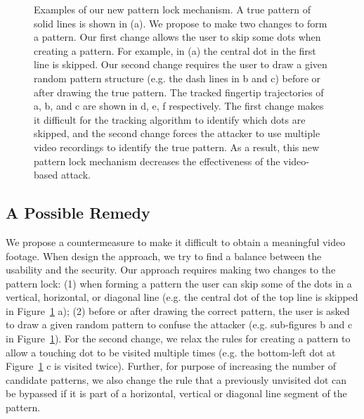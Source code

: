 \begin{figure}[!t]
{        }
        \caption{Examples of our new pattern lock mechanism. A true pattern of solid lines is shown
        in (a). We propose to make two changes to form a pattern.
        Our first change allows the user to skip some dots when creating a pattern.
        For example, in (a) the central dot in the first line is skipped.
        Our second change requires the user to draw a given random pattern structure (e.g. the dash lines in b and c)  before or after drawing the true pattern.
        The tracked fingertip trajectories of a, b, and c are shown in d, e, f respectively.
        The first change makes it difficult for the tracking algorithm to identify which dots are skipped, and the second change
         forces the attacker to use multiple video recordings to identify the true pattern. As a result, this new pattern lock mechanism decreases the
        effectiveness of the video-based attack.
        }
        \label{fig:protection}
    \end{figure}

\subsection{A Possible Remedy}
\label{section: potential-remedy}
We propose a countermeasure to make it difficult to obtain a meaningful video footage. When design the approach, we try
to find a balance between the usability and the security. Our approach requires making two  changes to the pattern
lock: (1) when forming a pattern the user can skip some of the dots in a vertical, horizontal, or diagonal line
(e.g. the central dot of the top line is skipped in Figure~\ref{fig:protection} a); (2) before or after drawing the correct pattern, the user is asked to draw a given random
pattern to confuse the attacker (e.g. sub-figures b and c in Figure~\ref{fig:protection}). For the second change, we relax the rules for
creating a pattern to allow a touching dot to be visited multiple times (e.g. the bottom-left dot at
Figure~\ref{fig:protection} c is visited twice). Further, for purpose of increasing the number of candidate
patterns, we also change the rule that a previously unvisited dot can be bypassed if it is part of a horizontal,
vertical or diagonal line segment of the pattern.

